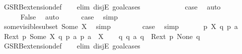 \begin{isabellebody}
\ GSRB{\isacharunderscore}{\kern0pt}extension{\isacharunderscore}{\kern0pt}def\isanewline
\ \ \isamarkupfalse%
\ {\isacharparenleft}{\kern0pt}elim\ disjE{\isacharcomma}{\kern0pt}\ goal{\isacharunderscore}{\kern0pt}cases{\isacharparenright}{\kern0pt}\isanewline
\ \ \ \ \isamarkupfalse%
\ {}\isanewline
\ \ \ \ \isamarkupfalse%
\ {\isacharquery}{\kern0pt}case\ \isamarkupfalse%
\ auto\isanewline
\ \ \isamarkupfalse%
\isanewline
\ \ \ \ \isamarkupfalse%
\ {}\isanewline
\ \ \ \ \isamarkupfalse%
\ False\ \isamarkupfalse%
\ auto\isanewline
\ \ \ \ \isamarkupfalse%
\ {\isacharquery}{\kern0pt}case\ \isamarkupfalse%
\ simp\isanewline
\ \ \isamarkupfalse%
\isanewline
\ \ \ \ \isamarkupfalse%
\ {}\isanewline
\ \ \ \ \isamarkupfalse%
\ {\isacartoucheopen}some{\isacharunderscore}{\kern0pt}visible{\isacharunderscore}{\kern0pt}subset\ {\isacharparenleft}{\kern0pt}Some\ X{\isacharparenright}{\kern0pt}{\isacartoucheclose}\ \isamarkupfalse%
\ simp\isanewline
\ \ \ \ \isamarkupfalse%
\ {}\ \isamarkupfalse%
\ {\isacharquery}{\kern0pt}case\ \isamarkupfalse%
\ simp\isanewline
\ \ \isamarkupfalse%
\isanewline
{}\isamarkupfalse%
\isanewline
\ \ \isamarkupfalse%
\ p\ X\ q\ p{\isacharprime}{\kern0pt}\ a\isanewline
\ \ \isamarkupfalse%
\ {\isacartoucheopen}{\isacharquery}{\kern0pt}R{\isacharunderscore}{\kern0pt}ext\ p\ {\isacharparenleft}{\kern0pt}Some\ X{\isacharparenright}{\kern0pt}\ q{\isacartoucheclose}\ {\isacartoucheopen}p\ {\isasymlongmapsto}a\ p{\isacharprime}{\kern0pt}{\isacartoucheclose}\ {\isacartoucheopen}a\ {\isasymin}\ X{\isacartoucheclose}\isanewline
\ \ \isamarkupfalse%
\ {\isacartoucheopen}{\isasymexists}q{\isacharprime}{\kern0pt}{\isachardot}{\kern0pt}\ q\ {\isasymlongmapsto}a\ q{\isacharprime}{\kern0pt}\ {\isasymand}\ {\isacharquery}{\kern0pt}R{\isacharunderscore}{\kern0pt}ext\ p{\isacharprime}{\kern0pt}\ None\ q{\isacharprime}{\kern0pt}{\isacartoucheclose}\ \isanewline
\ \ \ \ \isamarkupfalse%
\ GSRB{\isacharunderscore}{\kern0pt}extension{\isacharunderscore}{\kern0pt}def\isanewline
\ \ \isamarkupfalse%
\ {\isacharparenleft}{\kern0pt}elim\ disjE{\isacharcomma}{\kern0pt}\ goal{\isacharunderscore}{\kern0pt}cases{\isacharparenright}{\kern0pt}\isanewline

\end{isabellebody}
